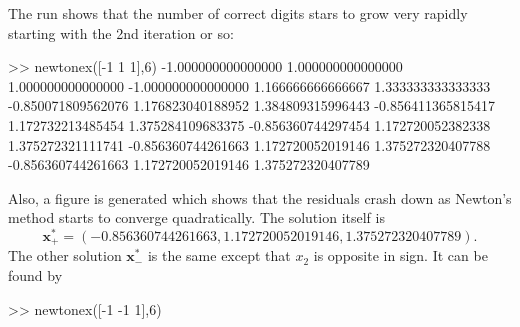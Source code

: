 \documentclass[11pt]{amsart}
\newcommand{\bx}{\mathbf{x}}
\begin{document}
The run shows that the number of correct digits stars to grow very rapidly starting with the 2nd iteration or so:
\begin{mVerb}
>> newtonex([-1 1 1],6)
-1.000000000000000   1.000000000000000   1.000000000000000
-1.000000000000000   1.166666666666667   1.333333333333333
-0.850071809562076   1.176823040188952   1.384809315996443
-0.856411365815417   1.172732213485454   1.375284109683375
-0.856360744297454   1.172720052382338   1.375272321111741
-0.856360744261663   1.172720052019146   1.375272320407788
-0.856360744261663   1.172720052019146   1.375272320407789
\end{mVerb}
Also, a figure is generated which shows that the residuals crash down as Newton's method starts to converge quadratically.  The solution itself is
    $$\bx_+^* = (-0.856360744261663, 1.172720052019146, 1.375272320407789).$$
The other solution $\bx_-^*$ is the same except that $x_2$ is opposite in sign.  It can be found by
\begin{mVerb}
>> newtonex([-1 -1 1],6)
\end{mVerb}

\end{document}
